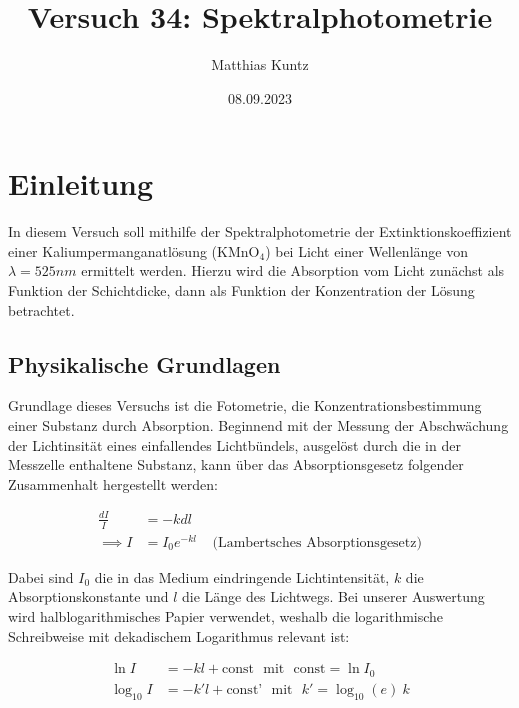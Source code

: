 \documentclass{article}
\title{Versuch 34: Spektralphotometrie}
\author{Matthias Kuntz}
\date{08.09.2023}
\begin{document}
\maketitle

\addtocounter{figure}{2}

\section{Einleitung}

In diesem Versuch soll mithilfe der Spektralphotometrie der Extinktionskoeffizient einer Kaliumpermanganatlösung (KMnO$_4$) bei Licht einer Wellenlänge von $\lambda = 525nm$ ermittelt werden. Hierzu wird die Absorption vom Licht zunächst als Funktion der Schichtdicke, dann als Funktion der Konzentration der Lösung betrachtet.

\subsection{Physikalische Grundlagen}

Grundlage dieses Versuchs ist die Fotometrie, die Konzentrationsbestimmung einer Substanz durch Absorption. Beginnend mit der Messung der Abschwächung der Lichtinsität eines einfallendes Lichtbündels, ausgelöst durch die in der Messzelle enthaltene Substanz, kann über das Absorptionsgesetz folgender Zusammenhalt hergestellt werden:

\begin{equation}
    \begin{split}
        \frac{dI}{I} &= -kdl \\
        \implies I &= I_0 e^{-kl} \ \ \ \ \ \text{(Lambertsches Absorptionsgesetz)}
    \end{split}
\end{equation}

Dabei sind $I_0$ die in das Medium eindringende Lichtintensität, $k$ die Absorptionskonstante und $l$ die Länge des Lichtwegs. Bei unserer Auswertung wird halblogarithmisches Papier verwendet, weshalb die logarithmische Schreibweise mit dekadischem Logarithmus relevant ist:

\begin{equation}
\begin{split}
    \ln{I} &= -kl + \text{const} \ \ \ \text{mit} \ \ \ \text{const} = \ln{I_0} \\
    \log_{10}{I} &= -k'l + \text{const'} \ \ \ \text{mit} \ \ \ k' = \log_{10}{(e)} \ k 
\end{split}
\end{equation}
\end{document}
